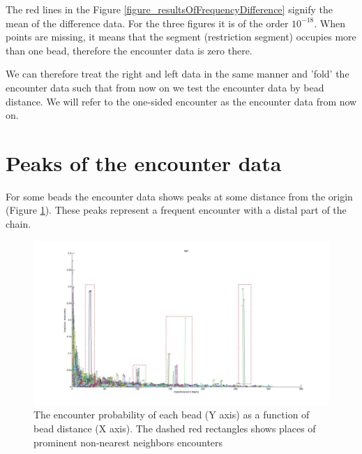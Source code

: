 \documentclass[12pt]{book}
\begin{document}
The red lines in the Figure \ref{figure_resultsOfFrequencyDifference} signify the mean of the difference data. For the three figures it is of the order $10^{-18}$. When points are missing, it means that the segment (restriction segment) occupies more than one bead, therefore the encounter data is zero there. 

We can therefore treat the right and left data in the same manner and 'fold' the encounter data such that from now on we test the encounter data by bead distance. We will refer to the one-sided encounter as the encounter data from now on. 

\section{Peaks of the encounter data}\label{section_peaksOfTheEncounterData}
For some beads the encounter data shows peaks at some distance from the origin (Figure \ref{figure_peaksOfTheEncounterProbabiltity307Beads}). 
These peaks represent a frequent encounter with a distal part of the chain. 

\begin{figure}[H]
\includegraphics*[scale=0.2]{EncounterFrequenciesByDistanceRep1}
\caption{\scriptsize{The encounter probability of each bead (Y axis) as a function of bead distance (X axis). The dashed red rectangles shows places of prominent non-nearest neighbors encounters}}
\label{figure_peaksOfTheEncounterProbabiltity307Beads}
\end{figure}
\end{document}
